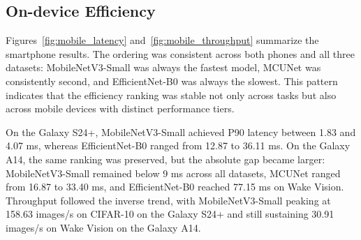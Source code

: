 \documentclass[runningheads]{llncs}
\begin{document}
\begin{table}[H]
\caption{Model storage footprint across datasets.}
\label{tab:model_size}
\centering
\scriptsize
\setlength{\tabcolsep}{3pt}
\end{table}

\subsection{On-device Efficiency}
Figures~\ref{fig:mobile_latency} and~\ref{fig:mobile_throughput} summarize the smartphone results. The ordering was consistent across both phones and all three datasets: MobileNetV3-Small was always the fastest model, MCUNet was consistently second, and EfficientNet-B0 was always the slowest. This pattern indicates that the efficiency ranking was stable not only across tasks but also across mobile devices with distinct performance tiers.

On the Galaxy S24+, MobileNetV3-Small achieved P90 latency between 1.83 and 4.07 ms, whereas EfficientNet-B0 ranged from 12.87 to 36.11 ms. On the Galaxy A14, the same ranking was preserved, but the absolute gap became larger: MobileNetV3-Small remained below 9 ms across all datasets, MCUNet ranged from 16.87 to 33.40 ms, and EfficientNet-B0 reached 77.15 ms on Wake Vision. Throughput followed the inverse trend, with MobileNetV3-Small peaking at 158.63 images/s on CIFAR-10 on the Galaxy S24+ and still sustaining 30.91 images/s on Wake Vision on the Galaxy A14.
\end{document}
